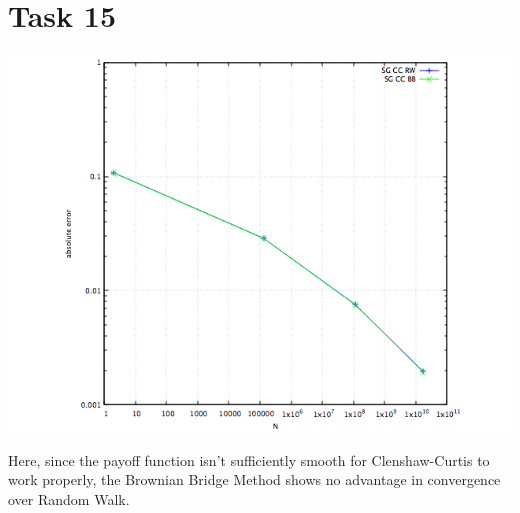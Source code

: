 \documentclass[10pt,a4paper]{article}
\begin{document}
\section*{Task 15}
\begin{center}
\includegraphics[scale=0.5]{task15.png}
\end{center}

Here, since the payoff function isn't sufficiently smooth for Clenshaw-Curtis to work properly, the Brownian Bridge Method shows no advantage in convergence over Random Walk. 
\end{document}
